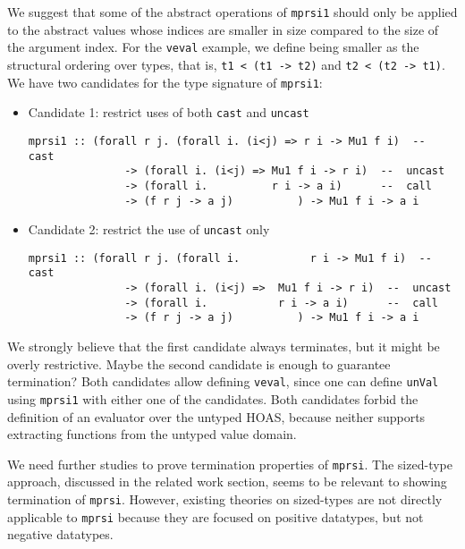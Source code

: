 We suggest that some of the abstract operations of \lstinline{mprsi1} should
only be applied to the abstract values whose indices are smaller in size
compared to the size of the argument index. For the \lstinline{veval} example,
we define being smaller as the structural ordering over types, that is,
\lstinline{t1 < (t1 -> t2)} and \lstinline{t2 < (t2 -> t1)}.
We have two candidates for the type signature of \lstinline{mprsi1}:
\begin{itemize}
\item Candidate 1: restrict uses of both \lstinline{cast} and \lstinline{uncast}
\begin{lstlisting}
mprsi1 :: (forall r j. (forall i. (i<j) => r i -> Mu1 f i)  --  cast
               -> (forall i. (i<j) => Mu1 f i -> r i)  --  uncast
               -> (forall i.          r i -> a i)      --  call
               -> (f r j -> a j)          ) -> Mu1 f i -> a i
\end{lstlisting}
\item Candidate 2: restrict the use of \lstinline{uncast} only
\begin{lstlisting}
mprsi1 :: (forall r j. (forall i.           r i -> Mu1 f i)  --  cast
               -> (forall i. (i<j) =>  Mu1 f i -> r i)  --  uncast
               -> (forall i.           r i -> a i)      --  call
               -> (f r j -> a j)          ) -> Mu1 f i -> a i
\end{lstlisting}
\end{itemize}
We strongly believe that the first candidate always terminates,
but it might be overly restrictive. Maybe the second candidate is
enough to guarantee termination? Both candidates allow defining
\lstinline{veval}, since one can define \lstinline{unVal}
using \lstinline{mprsi1} with either one of the candidates.
Both candidates forbid the definition of an evaluator over the untyped HOAS,
because neither supports extracting functions from the untyped value domain.

We need further studies to prove termination properties of \lstinline{mprsi}.
The sized-type approach, discussed in the related work section,
seems to be relevant to showing termination of \lstinline{mprsi}.
However, existing theories on sized-types are not directly applicable to
\lstinline{mprsi} because they are focused on positive datatypes, but
not negative datatypes.


\begin{figure}





\end{figure}

